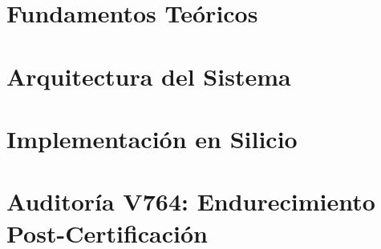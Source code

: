\documentclass[12pt, a4paper, twoside]{report}
\theoremstyle{definition}
\theoremstyle{remark}
\begin{document}
\part{Fundamentos Teóricos}












\part{Arquitectura del Sistema}







\part{Implementación en Silicio}






\part{Auditoría V764: Endurecimiento Post-Certificación}



\end{document}

